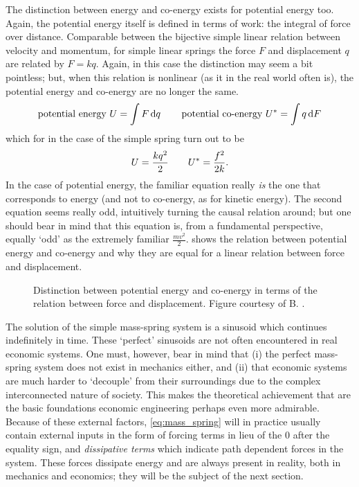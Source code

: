 The distinction between energy and co-energy exists for potential energy too. Again, the potential energy itself is defined in terms of work: the integral of force over distance. Comparable between the bijective simple linear relation between velocity and momentum, for simple linear springs the force $F$ and displacement $q$ are related by $F = kq$. Again, in this case the distinction may seem a bit pointless; but, when this relation is nonlinear (as it in the real world often is), the potential energy and co-energy are no longer the same. 
$$ \text{potential energy } U = \int F \dd{q} \qquad \text{potential co-energy } U^* = \int q \dd{F} $$
which for in the case of the simple spring turn out to be
$$ U = \frac{kq^2}{2} \qquad U^* = \frac{f^2}{2k}. $$
In the case of potential energy, the familiar equation really \emph{is} the one that corresponds to energy (and not to co-energy, as for kinetic energy). The second equation seems really odd, intuitively turning the causal relation around; but one should bear in mind that this equation is, from a fundamental perspective, equally `odd' as the extremely familiar $\frac{mv^2}{2}$.  shows the relation between potential energy and co-energy and why they are equal for a linear relation between force and displacement.
\begin{figure}[ht]
    \centering
    
    \caption{Distinction between potential energy and co-energy in terms of the relation between force and displacement. Figure courtesy of B. \citet{Krabbenborg2021}.}
    \label{fig:potential_energy}
\end{figure}
The solution of the simple mass-spring system is a sinusoid which continues indefinitely in time. These `perfect' sinusoids are not often encountered in real economic systems. One must, however, bear in mind that (i) the perfect mass-spring system does not exist in mechanics either, and (ii) that economic systems are much harder to `decouple' from their surroundings due to the complex interconnected nature of society. This makes the theoretical achievement that are the basic foundations economic engineering perhaps even more admirable. Because of these external factors, \cref{eq:mass_spring} will in practice usually contain external inputs in the form of forcing terms in lieu of the 0 after the equality sign, and \emph{dissipative terms} which indicate path dependent forces in the system. These forces dissipate energy and are always present in reality, both in mechanics and economics; they will be the subject of the next section. 

